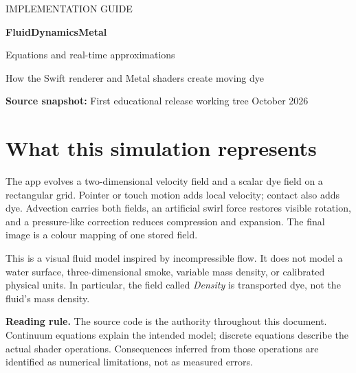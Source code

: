 \documentclass[11pt,a4paper]{article}
\newcommand{\note}[1]{\par\smallskip\noindent\colorbox{pale}{\parbox{\dimexpr\linewidth-2\fboxsep\relax}{#1}}\par\smallskip}
\begin{document}
\thispagestyle{empty}
{\sffamily\color{teal}\large IMPLEMENTATION GUIDE}\par
\vspace{7mm}
{\sffamily\bfseries\color{ink}\Huge FluidDynamicsMetal}\par
\vspace{3mm}
{\sffamily\color{ink}\LARGE Equations and real-time approximations}\par
\vspace{5mm}
{\large How the Swift renderer and Metal shaders create moving dye}\par
\vspace{5mm}
\textbf{Source snapshot:} First educational release working tree \quad\textbar{} October 2026

\section*{What this simulation represents}
The app evolves a two-dimensional velocity field and a scalar dye field on a
rectangular grid. Pointer or touch motion adds local velocity; contact also adds
dye. Advection carries both fields, an artificial swirl force restores visible
rotation, and a pressure-like correction reduces compression and expansion.
The final image is a colour mapping of one stored field.

This is a visual fluid model inspired by incompressible flow. It does not model a
water surface, three-dimensional smoke, variable mass density, or calibrated
physical units. In particular, the field called \emph{Density} is transported dye,
not the fluid's mass density.

\note{\textbf{Reading rule.} The source code is the authority throughout this
document. Continuum equations explain the intended model; discrete equations
describe the actual shader operations. Consequences inferred from those
operations are identified as numerical limitations, not as measured errors.}
\end{document}
